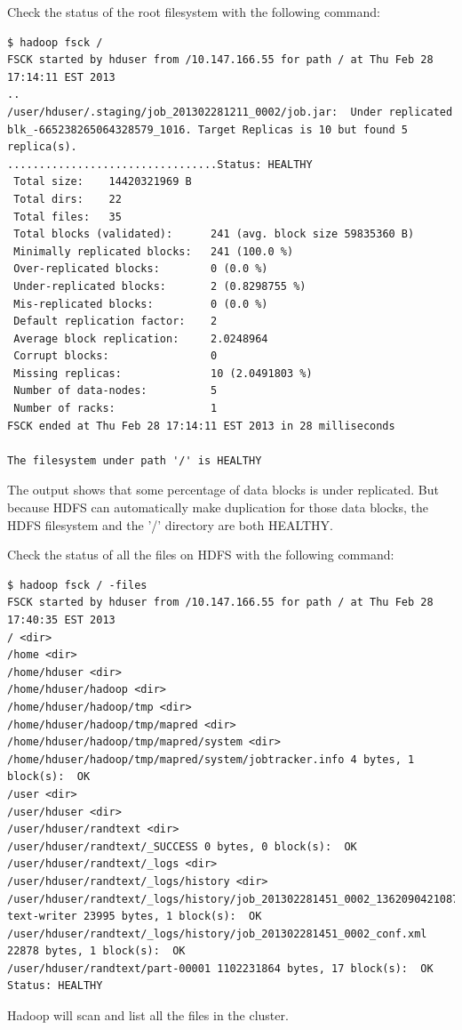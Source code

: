 Check the status of the root filesystem with the following command:
\lstset{style=bashstyle}
\begin{lstlisting}
$ hadoop fsck /
FSCK started by hduser from /10.147.166.55 for path / at Thu Feb 28 17:14:11 EST 2013
..
/user/hduser/.staging/job_201302281211_0002/job.jar:  Under replicated blk_-665238265064328579_1016. Target Replicas is 10 but found 5 replica(s).
.................................Status: HEALTHY
 Total size:    14420321969 B
 Total dirs:    22
 Total files:   35
 Total blocks (validated):      241 (avg. block size 59835360 B)
 Minimally replicated blocks:   241 (100.0 %)
 Over-replicated blocks:        0 (0.0 %)
 Under-replicated blocks:       2 (0.8298755 %)
 Mis-replicated blocks:         0 (0.0 %)
 Default replication factor:    2
 Average block replication:     2.0248964
 Corrupt blocks:                0
 Missing replicas:              10 (2.0491803 %)
 Number of data-nodes:          5
 Number of racks:               1
FSCK ended at Thu Feb 28 17:14:11 EST 2013 in 28 milliseconds

The filesystem under path '/' is HEALTHY
\end{lstlisting}

The output shows that some percentage of data blocks is under replicated. But because HDFS can automatically make duplication for those data blocks, the HDFS filesystem and the '/' directory are both HEALTHY.

Check the status of all the files on HDFS with the following command:
\lstset{style=bashstyle}
\begin{lstlisting}
$ hadoop fsck / -files
FSCK started by hduser from /10.147.166.55 for path / at Thu Feb 28 17:40:35 EST 2013
/ <dir>
/home <dir>
/home/hduser <dir>
/home/hduser/hadoop <dir>
/home/hduser/hadoop/tmp <dir>
/home/hduser/hadoop/tmp/mapred <dir>
/home/hduser/hadoop/tmp/mapred/system <dir>
/home/hduser/hadoop/tmp/mapred/system/jobtracker.info 4 bytes, 1 block(s):  OK
/user <dir>
/user/hduser <dir>
/user/hduser/randtext <dir>
/user/hduser/randtext/_SUCCESS 0 bytes, 0 block(s):  OK
/user/hduser/randtext/_logs <dir>
/user/hduser/randtext/_logs/history <dir>
/user/hduser/randtext/_logs/history/job_201302281451_0002_1362090421087_hduser_random-text-writer 23995 bytes, 1 block(s):  OK
/user/hduser/randtext/_logs/history/job_201302281451_0002_conf.xml 22878 bytes, 1 block(s):  OK
/user/hduser/randtext/part-00001 1102231864 bytes, 17 block(s):  OK
Status: HEALTHY
\end{lstlisting}
Hadoop will scan and list all the files in the cluster.

